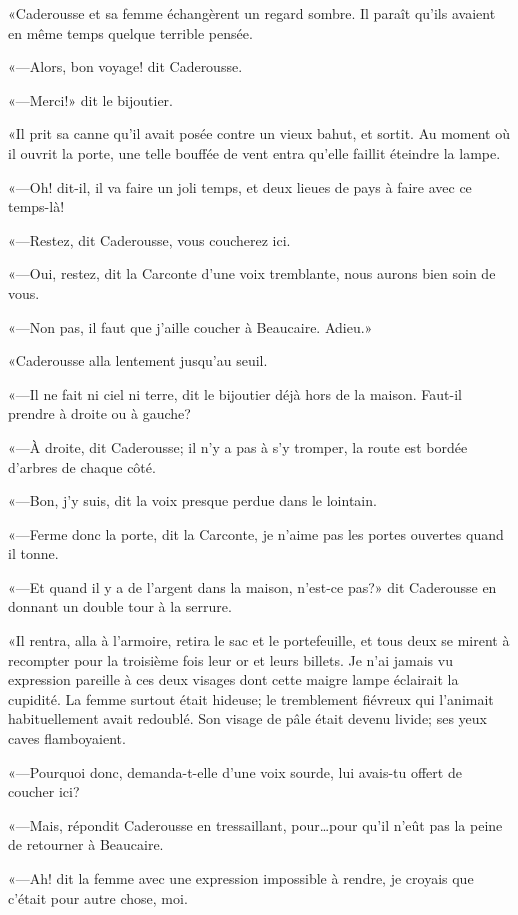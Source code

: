 «Caderousse et sa femme échangèrent un regard sombre. Il paraît qu'ils avaient en même temps quelque terrible pensée. 

«—Alors, bon voyage! dit Caderousse.  

«—Merci!» dit le bijoutier. 

«Il prit sa canne qu'il avait posée contre un vieux bahut, et sortit. Au moment où il ouvrit la porte, une telle bouffée de vent entra qu'elle faillit éteindre la lampe. 

«—Oh! dit-il, il va faire un joli temps, et deux lieues de pays à faire avec ce temps-là! 

«—Restez, dit Caderousse, vous coucherez ici. 

«—Oui, restez, dit la Carconte d'une voix tremblante, nous aurons bien soin de vous.  

«—Non pas, il faut que j'aille coucher à Beaucaire. Adieu.» 

«Caderousse alla lentement jusqu'au seuil. 

«—Il ne fait ni ciel ni terre, dit le bijoutier déjà hors de la maison. Faut-il prendre à droite ou à gauche? 

«—À droite, dit Caderousse; il n'y a pas à s'y tromper, la route est bordée d'arbres de chaque côté. 

«—Bon, j'y suis, dit la voix presque perdue dans le lointain. 

«—Ferme donc la porte, dit la Carconte, je n'aime pas les portes ouvertes quand il tonne.  

«—Et quand il y a de l'argent dans la maison, n'est-ce pas?» dit Caderousse en donnant un double tour à la serrure. 

«Il rentra, alla à l'armoire, retira le sac et le portefeuille, et tous deux se mirent à recompter pour la troisième fois leur or et leurs billets. Je n'ai jamais vu expression pareille à ces deux visages dont cette maigre lampe éclairait la cupidité. La femme surtout était hideuse; le tremblement fiévreux qui l'animait habituellement avait redoublé. Son visage de pâle était devenu livide; ses yeux caves flamboyaient. 

«—Pourquoi donc, demanda-t-elle d'une voix sourde, lui avais-tu offert de coucher ici? 

«—Mais, répondit Caderousse en tressaillant, pour\dots pour qu'il n'eût pas la peine de retourner à Beaucaire. 

«—Ah! dit la femme avec une expression impossible à rendre, je croyais que c'était pour autre chose, moi. 

